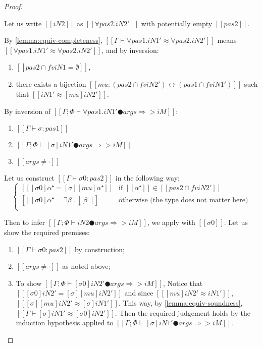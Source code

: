 \begin{proof}
\begin{caseof}
            Let us write $[[iN2]]$ as $[[∀pas2.iN2']]$ with potentially empty
            $[[pas2]]$.

            By \cref{lemma:equiv-completeness}, $[[Γ ⊢ ∀pas1.iN1' ≈ ∀pas2.iN2']]$ 
            means $[[∀pas1.iN1' ≈ ∀pas2.iN2']]$, and by inversion: 
            \begin{enumerate}
                \item $[[{pas2} ∩ fv iN1 = ∅]]$,
                \item there exists a bijection 
                    $[[mu : ({pas2} ∩ fv iN2') ↔ ({pas1} ∩ fv iN1')]]$
                    such that $[[iN1' ≈ [mu] iN2']]$.
            \end{enumerate}

            By inversion of $[[Γ ; Φ ⊢ ∀pas1.iN1' ● args ⇒> iM]]$:
            \begin{enumerate}
                \item $[[Γ ⊢ σ : pas1]]$        
                \item $[[Γ ; Φ ⊢ [σ]iN1' ● args ⇒> iM]]$
                \item $[[args ≠ ·]]$
            \end{enumerate}

            Let us construct $[[Γ ⊢ σ0 : pas2]]$ in the following way:
            $$
            \begin{cases}
                [[ [σ0]α⁺ =  [σ][mu]α⁺ ]] & \text{if } [[α⁺]] \in [[ {pas2} ∩ fv iN2' ]] \\
                [[ [σ0]α⁺ =  ∃β⁻.↓β⁻ ]] & \text{otherwise (the type does not matter here)} \\
            \end{cases}
            $$

            Then to infer $[[Γ ; Φ ⊢ iN2 ● args ⇒> iM]]$, we 
            apply  with $[[σ0]]$. 
            Let us show the required premises:
            \begin{enumerate}
                \item $[[Γ ⊢ σ0 : pas2]]$ by construction;
                \item $[[args ≠ ·]]$ as noted above;
                \item To show $[[Γ ; Φ ⊢ [σ0]iN2' ● args ⇒> iM]]$,
                Notice that $[[ [σ0]iN2' = [σ][mu]iN2' ]]$   
                and since $[[ [mu]iN2' ≈ iN1' ]]$, $[[ [σ][mu]iN2' ≈ [σ]iN1' ]]$.
                This way, by \cref{lemma:equiv-soundness}, $[[Γ ⊢ [σ]iN1' ≈ [σ0]iN2']]$.
                Then the required judgement holds by the induction hypothesis
                applied to $[[Γ ; Φ ⊢ [σ]iN1' ● args ⇒> iM]]$.
            \end{enumerate}
    \end{caseof}
\end{proof}

